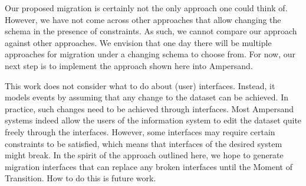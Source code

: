 \documentclass[runningheads]{llncs}
\begin{document}
Our proposed migration is certainly not the only approach one could think of.
However, we have not come across other approaches that allow changing the schema in the presence of constraints.
As such, we cannot compare our approach against other approaches.
We envision that one day there will be multiple approaches for migration under a changing schema to choose from.
For now, our next step is to implement the approach shown here into Ampersand.

This work does not consider what to do about (user) interfaces.
Instead, it models events by assuming that any change to the dataset can be achieved.
In practice, such changes need to be achieved through interfaces.
Most Ampersand systems indeed allow the users of the information system to edit the dataset quite freely through the interfaces.
However, some interfaces may require certain constraints to be satisfied, which means that interfaces of the desired system might break.
In the spirit of the approach outlined here, we hope to generate migration interfaces that can replace any broken interfaces until the Moment of Transition.
How to do this is future work.



\end{document}
